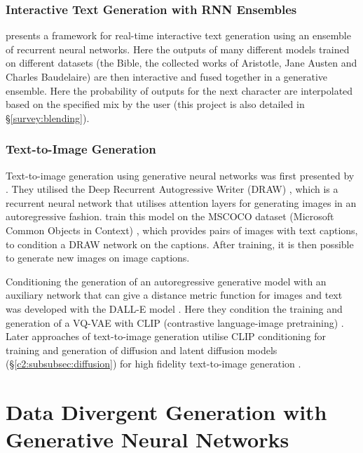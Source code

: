 \subsubsection{Interactive Text Generation with RNN Ensembles}

\cite{akten2016real} presents a framework for real-time interactive text generation using an ensemble of recurrent neural networks. 
Here the outputs of many different models trained on different datasets (the Bible, the collected works of Aristotle, Jane Austen and Charles Baudelaire) are then interactive and fused together in a generative ensemble.
Here the probability of outputs for the next character are interpolated based on the specified mix by the user (this project is also detailed in \S \ref{survey:blending}).

\subsubsection{Text-to-Image Generation}

Text-to-image generation using generative neural networks was first presented by \cite{mansimov2015generating}.
They utilised the Deep Recurrent Autogressive Writer (DRAW) \citep{gregor2015draw}, which is a recurrent neural network that utilises attention layers for generating images in an autoregressive fashion.
\cite{mansimov2015generating} train this model on the MSCOCO dataset (Microsoft Common Objects in Context) \citep{lin2014microsoft}, which provides pairs of images with text captions, to condition a DRAW network on the captions.
After training, it is then possible to generate new images on image captions.

Conditioning the generation of an autoregressive generative model with an auxiliary network that can give a distance metric function for images and text was developed with the DALL-E model \citep{ramesh2021zero}.
Here they condition the training and generation of a VQ-VAE \citep{razavi2019generating} with CLIP (contrastive language-image pretraining) \citep{radford2021learning}.
Later approaches of text-to-image generation utilise CLIP conditioning for training and generation of diffusion and latent diffusion models (\S \ref{c2:subsubsec:diffusion}) for high fidelity text-to-image generation \citep{rombach2022high}.


\section{Data Divergent Generation with Generative Neural Networks}
\label{c2:sec:data-divergent}

